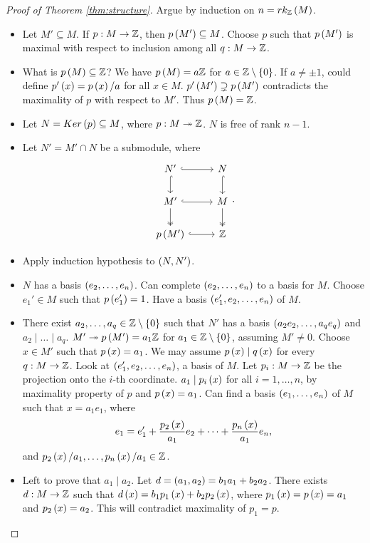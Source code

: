\begin{proof}[Proof of Theorem \ref{thm:structure}]
Argue by induction on $ n = rk_{\mathbb{Z}}\left( M \right) $.
\begin{itemize}
\item Let $ M' \subseteq M $. If $ p : M \to \mathbb{Z} $, then $ p\left( M' \right) \subseteq M $. Choose $ p $ such that $ p\left( M' \right) $ is maximal with respect to inclusion among all $ q : M \to \mathbb{Z} $.
\item What is $ p\left( M \right) \subseteq \mathbb{Z} $? We have $ p\left( M \right) = a\mathbb{Z} $ for $ a \in \mathbb{Z} \setminus \left\{ 0 \right\} $. If $ a \ne \pm 1 $, could define $ p'\left( x \right) = p\left( x \right) / a $ for all $ x \in M $. $ p'\left( M' \right) \supsetneq p\left( M' \right) $ contradicts the maximality of $ p $ with respect to $ M' $. Thus $ p\left( M \right) = \mathbb{Z} $.
\item Let $ N = Ker\left( p \right) \subseteq M $, where $ p : M \twoheadrightarrow \mathbb{Z} $. $ N $ is free of rank $ n - 1 $.
\item Let $ N' = M' \cap N $ be a submodule, where
$$
\begin{tikzcd}
N' \arrow[hookrightarrow]{r} \arrow[hookrightarrow]{d} & N \arrow[hookrightarrow]{d} \\
M' \arrow[hookrightarrow]{r} \arrow[twoheadrightarrow]{d} & M \arrow[twoheadrightarrow]{d} \\
p\rb{M'} \arrow[hookrightarrow]{r} & \Z
\end{tikzcd}.
$$
\item Apply induction hypothesis to $ \left( N, N' \right) $.
\item $ N $ has a basis $ \left( e_2, \dots, e_n \right) $. Can complete $ \left( e_2, \dots, e_n \right) $ to a basis for $ M $. Choose $ e_1' \in M $ such that $ p\left( e_1' \right) = 1 $. Have a basis $ \left( e_1', e_2, \dots, e_n \right) $ of $ M $.
\item There exist $ a_2, \dots, a_q \in \mathbb{Z} \setminus \left\{ 0 \right\} $ such that $ N' $ has a basis $ \left( a_2e_2, \dots, a_qe_q \right) $ and $ a_2 \mid \dots \mid a_q $. $ M' \twoheadrightarrow p\left( M' \right) = a_1\mathbb{Z} $ for $ a_1 \in \mathbb{Z} \setminus \left\{ 0 \right\} $, assuming $ M' \ne 0 $. Choose $ x \in M' $ such that $ p\left( x \right) = a_1 $. We may assume $ p\left( x \right) \mid q\left( x \right) $ for every $ q : M \to \mathbb{Z} $. Look at $ \left( e_1', e_2, \dots, e_n \right) $, a basis of $ M $. Let $ p_i : M \to \mathbb{Z} $ be the projection onto the $ i $-th coordinate. $ a_1 \mid p_i\left( x \right) $ for all $ i = 1, \dots, n $, by maximality property of $ p $ and $ p\left( x \right) = a_1 $. Can find a basis $ \left( e_1, \dots, e_n \right) $ of $ M $ such that $ x = a_1e_1 $, where
$$ e_1 = e_1' + \dfrac{p_2\left( x \right)}{a_1}e_2 + \dots + \dfrac{p_n\left( x \right)}{a_1}e_n, $$
and $ p_2\left( x \right) / a_1, \dots, p_n\left( x \right) / a_1 \in \mathbb{Z} $.
\item Left to prove that $ a_1 \mid a_2 $. Let $ d = \left( a_1, a_2 \right) = b_1a_1 + b_2a_2 $. There exists $ d : M \to \mathbb{Z} $ such that $ d\left( x \right) = b_1p_1\left( x \right) + b_2p_2\left( x \right) $, where $ p_1\left( x \right) = p\left( x \right) = a_1 $ and $ p_2\left( x \right) = a_2 $. This will contradict maximality of $ p_1 = p $.
\end{itemize}
\end{proof}

